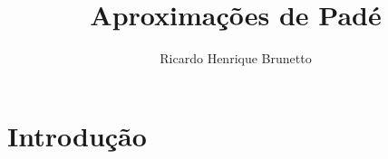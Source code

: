 

\sloppy

\title{Aproximações de Padé}

\author{Ricardo Henrique Brunetto}

\address{Departamento de Informática -- Universidade Estadual de Maringá (UEM)\\
	Maringá -- PR -- Brasil
}



	\maketitle

  \section{Introdução}

	
	


